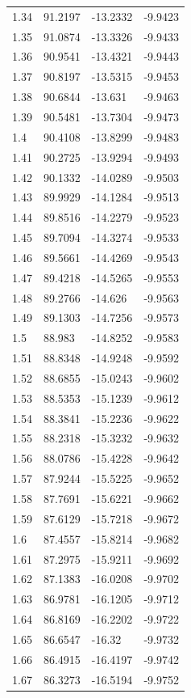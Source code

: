 \begin{tabular}{llll}
1.34 & 91.2197 & -13.2332 & -9.9423 \\
1.35 & 91.0874 & -13.3326 & -9.9433 \\
1.36 & 90.9541 & -13.4321 & -9.9443 \\
1.37 & 90.8197 & -13.5315 & -9.9453 \\
1.38 & 90.6844 & -13.631 & -9.9463 \\
1.39 & 90.5481 & -13.7304 & -9.9473 \\
1.4 & 90.4108 & -13.8299 & -9.9483 \\
1.41 & 90.2725 & -13.9294 & -9.9493 \\
1.42 & 90.1332 & -14.0289 & -9.9503 \\
1.43 & 89.9929 & -14.1284 & -9.9513 \\
1.44 & 89.8516 & -14.2279 & -9.9523 \\
1.45 & 89.7094 & -14.3274 & -9.9533 \\
1.46 & 89.5661 & -14.4269 & -9.9543 \\
1.47 & 89.4218 & -14.5265 & -9.9553 \\
1.48 & 89.2766 & -14.626 & -9.9563 \\
1.49 & 89.1303 & -14.7256 & -9.9573 \\
1.5 & 88.983 & -14.8252 & -9.9583 \\
1.51 & 88.8348 & -14.9248 & -9.9592 \\
1.52 & 88.6855 & -15.0243 & -9.9602 \\
1.53 & 88.5353 & -15.1239 & -9.9612 \\
1.54 & 88.3841 & -15.2236 & -9.9622 \\
1.55 & 88.2318 & -15.3232 & -9.9632 \\
1.56 & 88.0786 & -15.4228 & -9.9642 \\
1.57 & 87.9244 & -15.5225 & -9.9652 \\
1.58 & 87.7691 & -15.6221 & -9.9662 \\
1.59 & 87.6129 & -15.7218 & -9.9672 \\
1.6 & 87.4557 & -15.8214 & -9.9682 \\
1.61 & 87.2975 & -15.9211 & -9.9692 \\
1.62 & 87.1383 & -16.0208 & -9.9702 \\
1.63 & 86.9781 & -16.1205 & -9.9712 \\
1.64 & 86.8169 & -16.2202 & -9.9722 \\
1.65 & 86.6547 & -16.32 & -9.9732 \\
1.66 & 86.4915 & -16.4197 & -9.9742 \\
1.67 & 86.3273 & -16.5194 & -9.9752 \\

\end{tabular}
